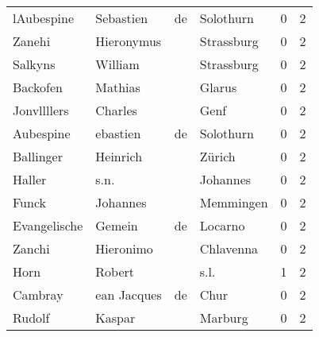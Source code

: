 \begin{tabular}{llllrr}
               lAubespine &                          Sebastien &          de &                                   Solothurn &          0 &         2 \\
                   Zanehi &                         Hieronymus &             &                                  Strassburg &          0 &         2 \\
                  Salkyns &                            William &             &                                  Strassburg &          0 &         2 \\
                 Backofen &                            Mathias &             &                                      Glarus &          0 &         2 \\
              Jonvllllers &                            Charles &             &                                        Genf &          0 &         2 \\
                Aubespine &                           ebastien &          de &                                   Solothurn &          0 &         2 \\
                Ballinger &                           Heinrich &             &                                      Zürich &          0 &         2 \\
                   Haller &                               s.n. &             &                                    Johannes &          0 &         2 \\
                    Funck &                           Johannes &             &                                   Memmingen &          0 &         2 \\
             Evangelische &                             Gemein &          de &                                     Locarno &          0 &         2 \\
                   Zanchi &                          Hieronimo &             &                                   Chlavenna &          0 &         2 \\
                     Horn &                             Robert &             &                                        s.l. &          1 &         2 \\
                  Cambray &                        ean Jacques &          de &                                        Chur &          0 &         2 \\
                   Rudolf &                             Kaspar &             &                                     Marburg &          0 &         2 \\

\end{tabular}
